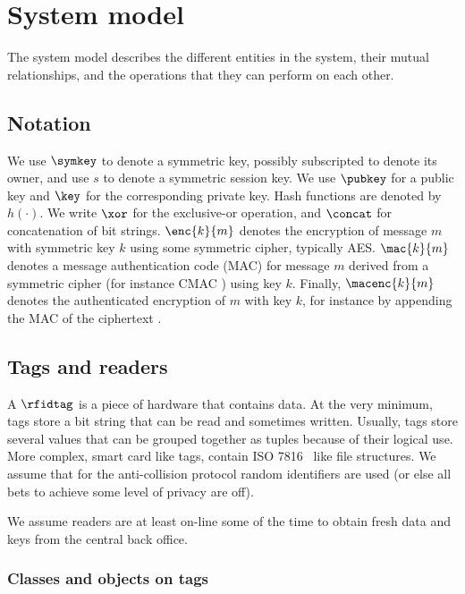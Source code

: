 \section{System model}
\label{sec-model}

The system model describes the different entities in the system, their mutual
relationships, and the operations that they can perform on each other.

\subsection{Notation}

We use $\symkey$ to denote a symmetric key, possibly subscript\-ed to denote its
owner, and use $s$ to denote a symmetric session key. 
We use $\pubkey$ for a public key and $\key$ for the corresponding private key.
Hash functions are
denoted by $h(\cdot)$. We write $\xor$ for the exclusive-or operation, and
$\concat$ for concatenation of bit strings. $\enc{k}{m}$ denotes the encryption
of message $m$ with symmetric key $k$ using some symmetric cipher, typically
AES. $\mac{k}{m}$ denotes a message authentication code (MAC) for message
$m$ derived from
a symmetric cipher (for instance CMAC
\cite{NIST-PUB-800-38B,DBLP:conf/crypto/BlackR00}) using key $k$.
Finally, $\macenc{k}{m}$ denotes the authenticated encryption of $m$ with key
$k$, for instance by appending the MAC of the ciphertext 
\cite{DBLP:conf/asiacrypt/BellareN00}.


\subsection{Tags and readers}

A  $\rfidtag$ is a piece of hardware that contains data. 
At the very minimum, tags store a bit string that can be read and sometimes written. 
Usually, tags store several values that can be grouped together as tuples 
because of their logical use. More complex, smart card like tags, contain
ISO 7816~\cite{ISO7816} like file structures. We assume that for the anti-collision protocol random identifiers are used (or else all bets to achieve some level of privacy are off).

We assume readers are at least on-line some of the time to obtain fresh data and keys from the central back office.

\subsubsection{Classes and objects on tags}


